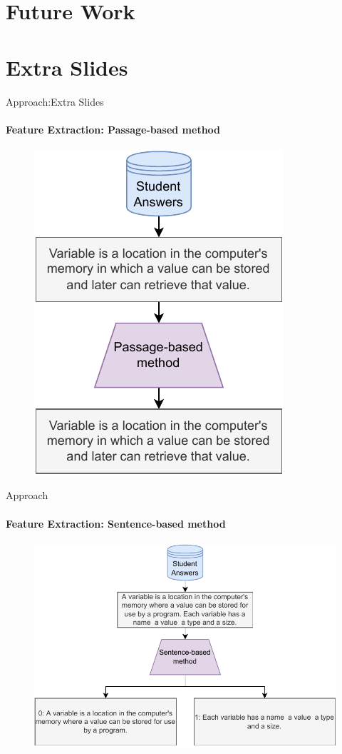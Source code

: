 \documentclass[aspectratio=169]{beamer}
\begin{document}
\section{Future Work}
\section{Extra Slides}
\begin{frame}{Approach:Extra Slides}
\framesubtitle{Feature Extraction: Passage-based method}
\begin{figure}
\centering
\includegraphics[scale = 0.65]{images/passage_FE.pdf}
\label{fig:passage fe}
\end{figure}
\end{frame}
\begin{frame}{Approach}
\framesubtitle{Feature Extraction: Sentence-based method}
\begin{figure}
\centering
\includegraphics[scale = 0.65]{images/sentence_FE.pdf}
\label{fig:sentence fe}
\end{figure}
\end{frame}
\end{document}
